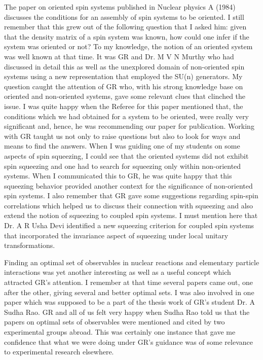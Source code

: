 The paper on oriented spin systems published in Nuclear physics A (1984) discusses the conditions for an assembly of spin systems to be oriented. I still remember that this grew out of the following question that I asked him: given that the density matrix of a spin system was known, how could one infer if the system was oriented or not? To my knowledge, the notion of an oriented system was well known at that time. It was GR and Dr. M V N Murthy who had discussed in detail this as well as the unexplored domain of non-oriented spin systems using a new representation that employed the SU(n) generators. My question caught the attention of GR who, with his strong knowledge base on oriented and non-oriented systems, gave some relevant clues that clinched the issue. I was quite happy when the Referee for this paper mentioned that, the conditions which we had obtained for a system to be oriented, were really very significant and, hence, he was recommending our paper for publication. Working with GR taught us not only to raise questions but also to look for ways and means to find the answers. When I was guiding one of my students on some aspects of spin squeezing, I could see that the oriented systems did not exhibit spin squeezing and one had to search for squeezing only within non-oriented systems. When I communicated this to GR, he was quite happy that this squeezing behavior provided another context for the significance of non-oriented spin systems. I also remember that GR gave some suggestions regarding spin-spin correlations which helped us to discuss their connection with squeezing and also extend the notion of squeezing to coupled spin systems. I must mention here that Dr. A R Usha Devi identified a new squeezing criterion for coupled spin systems that incorporated the invariance aspect of squeezing under local unitary transformations.

Finding an optimal set of observables in nuclear reactions and elementary particle interactions was yet another interesting as well as a useful concept which attracted GR's attention. I remember at that time several papers came out, one after the other, giving several and better optimal sets. I was also involved in one paper which was supposed to be a part of the thesis work of GR's student Dr. A Sudha Rao. GR and all of us felt very happy when Sudha Rao told us that the papers on optimal sets of observables were mentioned and cited by two experimental groups abroad. This was certainly one instance that gave me confidence that what we were doing under GR's guidance was of some relevance to experimental research elsewhere.

